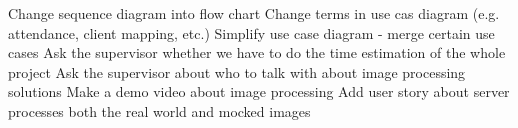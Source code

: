 \nextItem Change sequence diagram into flow chart 
\nextItem Change terms in use cas diagram (e.g. attendance, client mapping, 
        etc.) 
\nextItem Simplify use case diagram - merge certain use cases 
\nextItem Ask the supervisor whether we have to do the time estimation of the 
whole project 
\nextItem Ask the supervisor about who to talk with about image processing 
solutions 
\nextItem Make a demo video about image processing 
\nextItem Add user story about server processes both the real world and mocked 
images 
